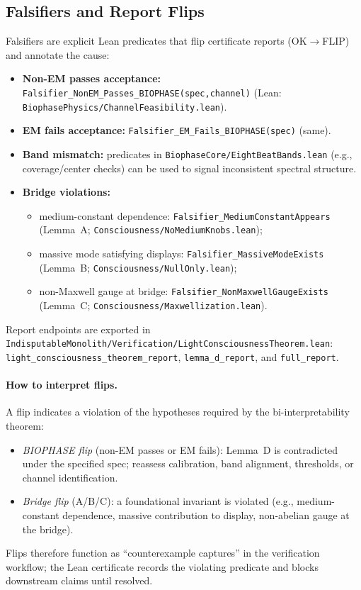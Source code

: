 \documentclass[12pt,a4paper]{article}
\begin{document}
\subsection{Falsifiers and Report Flips}
Falsifiers are explicit Lean predicates that flip certificate reports (OK\(\to\)FLIP) and annotate the cause:
\begin{itemize}
  \item \textbf{Non-EM passes acceptance:} \texttt{Falsifier\_NonEM\_Passes\_BIOPHASE(spec,channel)} (Lean: \texttt{BiophasePhysics/ChannelFeasibility.lean}).
  \item \textbf{EM fails acceptance:} \texttt{Falsifier\_EM\_Fails\_BIOPHASE(spec)} (same).
  \item \textbf{Band mismatch:} predicates in \texttt{BiophaseCore/EightBeatBands.lean} (e.g., coverage/center checks) can be used to signal inconsistent spectral structure.
  \item \textbf{Bridge violations:} 
    \begin{itemize}
      \item medium-constant dependence: \texttt{Falsifier\_MediumConstantAppears} (Lemma~A; \texttt{Consciousness/NoMediumKnobs.lean});
      \item massive mode satisfying displays: \texttt{Falsifier\_MassiveModeExists} (Lemma~B; \texttt{Consciousness/NullOnly.lean});
      \item non-Maxwell gauge at bridge: \texttt{Falsifier\_NonMaxwellGaugeExists} (Lemma~C; \texttt{Consciousness/Maxwellization.lean}).
    \end{itemize}
\end{itemize}
Report endpoints are exported in \texttt{IndisputableMonolith/Verification/LightConsciousnessTheorem.lean}: \texttt{light\_consciousness\_theorem\_report}, \texttt{lemma\_d\_report}, and \texttt{full\_report}.

\paragraph{How to interpret flips.}
A flip indicates a violation of the hypotheses required by the bi-interpretability theorem:
\begin{itemize}
  \item \emph{BIOPHASE flip} (non-EM passes or EM fails): Lemma~D is contradicted under the specified spec; reassess calibration, band alignment, thresholds, or channel identification.
  \item \emph{Bridge flip} (A/B/C): a foundational invariant is violated (e.g., medium-constant dependence, massive contribution to display, non-abelian gauge at the bridge).
\end{itemize}
Flips therefore function as ``counterexample captures'' in the verification workflow; the Lean certificate records the violating predicate and blocks downstream claims until resolved.
\end{document}
